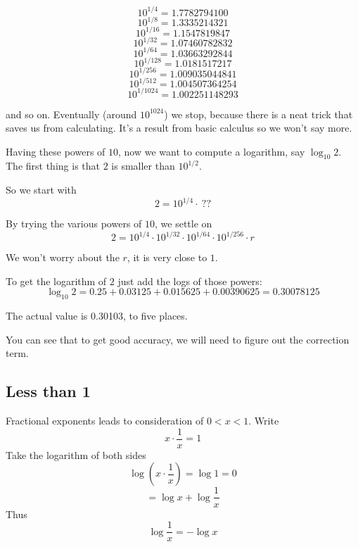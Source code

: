 \documentclass[11pt, oneside]{article}
\begin{document}
\[ 10^{1/4} = 1.7782794100 \]
\[ 10^{1/8} = 1.3335214321 \]
\[ 10^{1/16} = 1.1547819847 \]
\[ 10^{1/32} = 1.07460782832 \]
\[ 10^{1/64} = 1.03663292844 \]
\[ 10^{1/128} = 1.0181517217 \]
\[ 10^{1/256} = 1.009035044841 \]
\[ 10^{1/512} = 1.004507364254 \]
\[ 10^{1/1024} = 1.002251148293 \]

and so on.  Eventually (around $10^{1024}$) we stop, because there is a neat trick that saves us from calculating.  It's a result from basic calculus so we won't say more.

Having these powers of $10$, now we want to compute a logarithm, say $\log_{10} 2$.  The first thing is that $2$ is smaller than $10^{1/2}$.  

So we start with 
\[ 2 = 10^{1/4} \cdot \ ?? \]

By trying the various powers of $10$, we settle on 
\[ 2 = 10^{1/4} \cdot 10^{1/32} \cdot 10^{1/64} \cdot 10^{1/256} \cdot r \]

We won't worry about the $r$, it is very close to $1$.

To get the logarithm of $2$ just add the logs of those powers:
\[ \log_{10} 2 = 0.25 + 0.03125 + 0.015625 + 0.00390625  = 0.30078125 \]

The actual value is 0.30103, to five places.

You can see that to get good accuracy, we will need to figure out the correction term.

\subsection*{Less than 1}
Fractional exponents leads to consideration of $0 < x < 1$.  Write
\[ x \cdot \frac{1}{x} = 1 \]
Take the logarithm of both sides
\[ \log(x \cdot \frac{1}{x} ) = \log 1 = 0 \]
\[ = \log x + \log \frac{1}{x} \]
Thus
\[ \log \frac{1}{x} = - \log x \]
\end{document}
